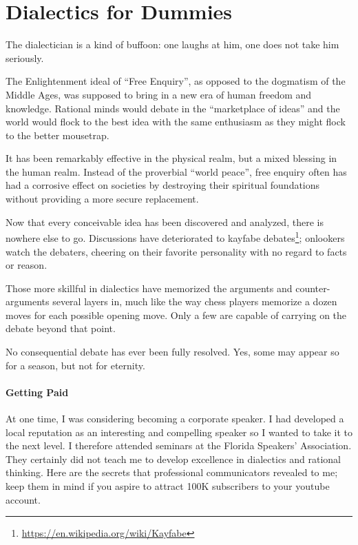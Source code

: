 \section{Dialectics for Dummies}

\begin{quotex}
The dialectician is a kind of buffoon: one laughs at him, one does not take him seriously.
\end{quotex}


The Enlightenment ideal of ``Free Enquiry'', as opposed to the dogmatism of the Middle Ages, was supposed to bring in a new era of human freedom and knowledge. Rational minds would debate in the ``marketplace of ideas'' and the world would flock to the best idea with the same enthusiasm as they might flock to the better mousetrap.

It has been remarkably effective in the physical realm, but a mixed blessing in the human realm. Instead of the proverbial ``world peace'', free enquiry often has had a corrosive effect on societies by destroying their spiritual foundations without providing a more secure replacement.

Now that every conceivable idea has been discovered and analyzed, there is nowhere else to go. Discussions have deteriorated to kayfabe debates\footnote{\url{https://en.wikipedia.org/wiki/Kayfabe}}; onlookers watch the debaters, cheering on their favorite personality with no regard to facts or reason.

Those more skillful in dialectics have memorized the arguments and counter-arguments several layers in, much like the way chess players memorize a dozen moves for each possible opening move. Only a few are capable of carrying on the debate beyond that point.

No consequential debate has ever been fully resolved. Yes, some may appear so for a season, but not for eternity.

\paragraph{Getting Paid}


At one time, I was considering becoming a corporate speaker. I had developed a local reputation as an interesting and compelling speaker so I wanted to take it to the next level. I therefore attended seminars at the Florida Speakers' Association. They certainly did not teach me to develop excellence in dialectics and rational thinking. Here are the secrets that professional communicators revealed to me; keep them in mind if you aspire to attract 100K subscribers to your youtube account.

